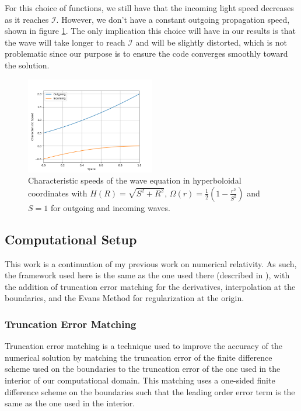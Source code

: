 For this choice of functions, we still have that the incoming light speed decreases as it reaches $\mathscr{I}$. However, we don't have a constant outgoing propagation speed, shown in figure \ref{fig:Bad_Speeds}. The only implication this choice will have in our results is that the wave will take longer to reach $\mathscr{I}$ and will be slightly distorted, which is not problematic since our purpose is to ensure the code converges smoothly toward the solution.

\begin{figure}[h]
    \centering
    \includegraphics[width=0.5\textwidth]{Images/Bad_Speeds.png}
    \caption{Characteristic speeds of the wave equation in hyperboloidal coordinates with $H(R) = \sqrt{S^2+R^2}$, $\Omega(r) = \frac{1}{2} \left(1 - \frac{r^2}{S^2}\right)$ and $S = 1$ for outgoing and incoming waves.}
    \label{fig:Bad_Speeds}
\end{figure}

\subsection{Computational Setup}

This work is a continuation of my previous work on numerical relativity. As such, the framework used here is the same as the one used there (described in \cite{Ficalho_2023}), with the addition of truncation error matching for the derivatives, interpolation at the boundaries, and the Evans Method for regularization at the origin.

\subsubsection{Truncation Error Matching}

Truncation error matching is a technique used to improve the accuracy of the numerical solution by matching the truncation error of the finite difference scheme used on the boundaries to the truncation error of the one used in the interior of our computational domain. This matching uses a one-sided finite difference scheme on the boundaries such that the leading order error term is the same as the one used in the interior.

